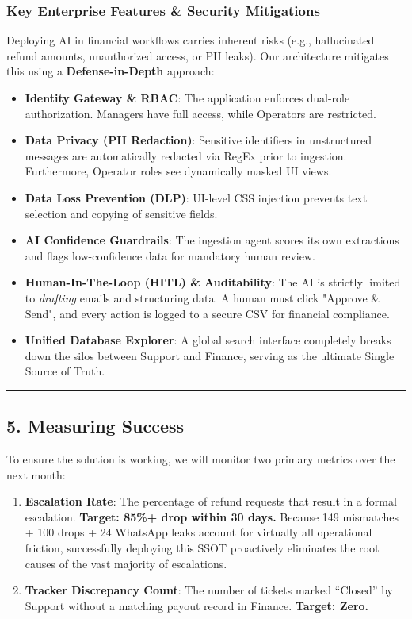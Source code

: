 \documentclass[
]{article}
\providecommand{\tightlist}{%
  \setlength{\itemsep}{0pt}\setlength{\parskip}{0pt}}
\begin{document}
\subsubsection{Key Enterprise Features \& Security Mitigations}\label{operational-safety-risks-mitigations}
Deploying AI in financial workflows carries inherent risks (e.g., hallucinated refund amounts, unauthorized access, or PII leaks). Our architecture mitigates this using a \textbf{Defense-in-Depth} approach:
\begin{itemize}
\tightlist
\item \textbf{Identity Gateway \& RBAC}: The application enforces dual-role authorization. Managers have full access, while Operators are restricted.
\item \textbf{Data Privacy (PII Redaction)}: Sensitive identifiers in unstructured messages are automatically redacted via RegEx prior to ingestion. Furthermore, Operator roles see dynamically masked UI views.
\item \textbf{Data Loss Prevention (DLP)}: UI-level CSS injection prevents text selection and copying of sensitive fields.
\item \textbf{AI Confidence Guardrails}: The ingestion agent scores its own extractions and flags low-confidence data for mandatory human review.
\item \textbf{Human-In-The-Loop (HITL) \& Auditability}: The AI is strictly limited to \textit{drafting} emails and structuring data. A human must click "Approve \& Send", and every action is logged to a secure CSV for financial compliance.
\item \textbf{Unified Database Explorer}: A global search interface completely breaks down the silos between Support and Finance, serving as the ultimate Single Source of Truth.
\end{itemize}

\begin{center}\rule{0.5\linewidth}{0.5pt}\end{center}

\subsection{5. Measuring Success}\label{measuring-success}

To ensure the solution is working, we will monitor two primary metrics over the next month:
\begin{enumerate}
\def\labelenumi{\arabic{enumi}.}
\tightlist
\item \textbf{Escalation Rate}: The percentage of refund requests that result in a formal escalation. \textbf{Target: 85\%+ drop within 30 days.} Because 149 mismatches + 100 drops + 24 WhatsApp leaks account for virtually all operational friction, successfully deploying this SSOT proactively eliminates the root causes of the vast majority of escalations.
\item \textbf{Tracker Discrepancy Count}: The number of tickets marked ``Closed'' by Support without a matching payout record in Finance. \textbf{Target: Zero.}
\end{enumerate}
\end{document}
